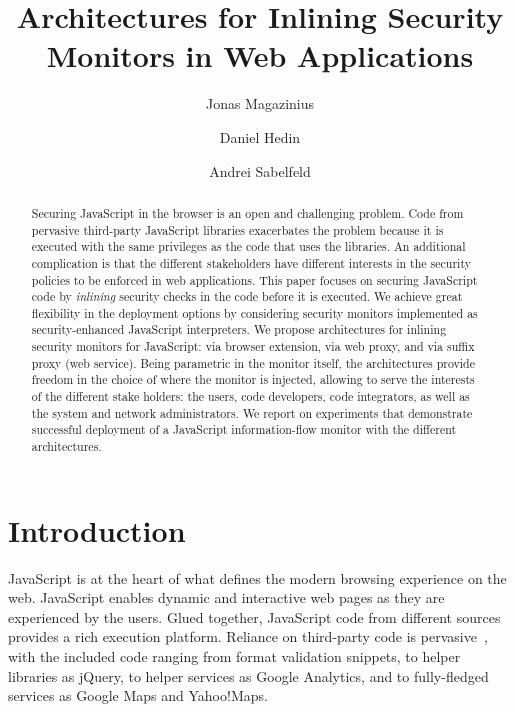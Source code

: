 \documentclass{llncs}
\title{Architectures for Inlining Security Monitors in Web Applications}
\author{Jonas Magazinius \and Daniel Hedin \and Andrei Sabelfeld}
\institute{Chalmers University of Technology, Gothenburg, Sweden}
\begin{document}
\maketitle

\thispagestyle{plain}

\begin{abstract}
Securing JavaScript in the browser is an open and challenging
problem. Code from pervasive third-party JavaScript libraries exacerbates the
problem because it is executed with the same privileges as the code
that uses the libraries.
%
An additional complication is that the different stakeholders have
different interests in the security policies to be enforced
in web applications.
%
This paper focuses on securing JavaScript code by \emph{inlining}
security checks in the code before it is executed.
%
We achieve great flexibility in the deployment options by considering
security monitors implemented as security-enhanced JavaScript interpreters.
%
We propose architectures for inlining security monitors for JavaScript: via
browser extension, via web proxy, and via suffix proxy (web service). 
%
Being parametric in the monitor itself,
the architectures provide freedom in the choice of where the monitor is
injected, allowing to serve the interests of the different stake
holders: the users, code developers, code
integrators, as well as the system and network administrators.
%
We report on experiments that demonstrate successful deployment of a JavaScript
information-flow monitor with the different architectures.
\end{abstract}










\section{Introduction}
\label{sec:intro}
JavaScript is at the heart of what defines the modern
browsing experience on the web. JavaScript enables dynamic and interactive
web pages as they are experienced by the users. Glued together,
JavaScript code from different sources provides
a rich execution platform. Reliance on third-party code is
pervasive~\cite{Nikiforakis+:CCS12}, with the included code ranging from
format validation snippets, to helper
libraries as jQuery, to helper services as Google Analytics, and to fully-fledged services as
Google Maps and Yahoo!\@ Maps.
\end{document}

